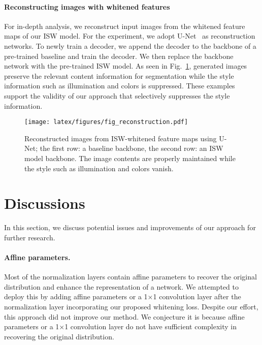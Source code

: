 \documentclass[final]{latex/cvpr}
\begin{document}
\vspace*{-0.45cm}
\paragraph{Reconstructing images with whitened features} For in-depth analysis, we reconstruct input images from the whitened feature maps of our ISW model. For the experiment, we adopt U-Net~\cite{ronneberger2015u} as reconstruction networks. To newly train a decoder, we append the decoder to the backbone of a pre-trained baseline and train the decoder. We then replace the backbone network with the pre-trained ISW model. As seen in Fig.~\ref{fig:reconstruction}, generated images preserve the relevant content information for segmentation while the style information such as illumination and colors is suppressed. These examples support the validity of our approach that selectively suppresses the style information.



\begin{figure}[t!]
\begin{center}
  \texttt{[image: latex/figures/fig\_reconstruction.pdf]}
\end{center}
\vspace*{-0.3cm}
   \caption{Reconstructed images from ISW-whitened feature maps using U-Net; the first row: a baseline backbone, the second row: an ISW model backbone. The image contents are properly maintained while the style such as illumination and colors vanish.}
\label{fig:reconstruction}
\vspace*{-0.45cm}
\end{figure}

\vspace{-0.1cm}
\section{Discussions}
\vspace{-0.1cm}
In this section, we discuss potential issues and improvements of our approach for further research. \vspace{-10pt}
\vspace{-0.1cm}
\paragraph{Affine parameters.} Most of the normalization layers contain affine parameters to recover the original distribution and enhance the representation of a network. We attempted to deploy this by adding affine parameters or a 1$\times$1 convolution layer after the normalization layer incorporating our proposed whitening loss. Despite our effort, this approach did not improve our method. We conjecture it is because affine parameters or a 1$\times$1 convolution layer do not have sufficient complexity in recovering the original distribution.\vspace{-20pt}
\vspace{-0.1cm}
\end{document}

